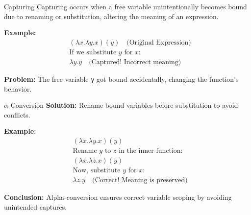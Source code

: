 \documentclass{beamer}
\begin{document}
  


\begin{frame}{Capturing}
  Capturing occurs when a free variable unintentionally becomes bound due to renaming or substitution, altering the meaning of an expression.
  
  \vspace{0.5cm}
  \textbf{Example:}
  \begin{align*}
      & (\lambda x. \lambda y. x) (y) \quad \text{(Original Expression)} \\
      & \text{If we substitute } y \text{ for } x:\\
      & \lambda y. y \quad \text{(Captured! Incorrect meaning)}
  \end{align*}

  \vspace{0.5cm}
  \textbf{Problem:} The free variable \texttt{y} got bound accidentally, changing the function's behavior.
\end{frame}

\begin{frame}{$\alpha$-Conversion}
  \textbf{Solution:} Rename bound variables before substitution to avoid conflicts.
  
  \vspace{0.5cm}
  \textbf{Example:}
  \begin{align*}
      & (\lambda x. \lambda y. x) (y) \\
      & \text{Rename } y \text{ to } z \text{ in the inner function:}\\
      & (\lambda x. \lambda z. x) (y) \\
      & \text{Now, substitute } y \text{ for } x:\\
      & \lambda z. y \quad \text{(Correct! Meaning is preserved)}
  \end{align*}

  \vspace{0.5cm}
  \textbf{Conclusion:} Alpha-conversion ensures correct variable scoping by avoiding unintended captures.
\end{frame}
\end{document}

